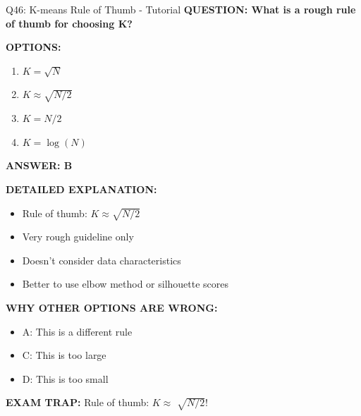 \documentclass[8pt]{beamer}
\begin{document}
	\begin{frame}{Q46: K-means Rule of Thumb - Tutorial}
		\fontsize{6.5}{7.5}\selectfont
		\textbf{QUESTION: What is a rough rule of thumb for choosing K?}
		
		\vspace{0.1cm}
		\textbf{OPTIONS:}
		\begin{enumerate}
			\item $K = \sqrt{N}$
			\item $K \approx \sqrt{N/2}$
			\item $K = N/2$
			\item $K = \log(N)$
		\end{enumerate}
		
		\vspace{0.1cm}
		\textcolor{myblue}{\textbf{ANSWER: B}}
		
		\vspace{0.1cm}
		\textbf{DETAILED EXPLANATION:}
		\begin{itemize}
			\item Rule of thumb: $K \approx \sqrt{N/2}$
			\item Very rough guideline only
			\item Doesn't consider data characteristics
			\item Better to use elbow method or silhouette scores
		\end{itemize}
		
		\vspace{0.1cm}
		\textcolor{myred}{\textbf{WHY OTHER OPTIONS ARE WRONG:}}
		\begin{itemize}
			\item \textcolor{myred}{A:} This is a different rule
			\item \textcolor{myred}{C:} This is too large
			\item \textcolor{myred}{D:} This is too small
		\end{itemize}
		
		\textcolor{myred}{\textbf{EXAM TRAP:}} Rule of thumb: $K \approx$ \textcolor{myblue}{$\sqrt{N/2}$}!
	\end{frame}
	
\end{document}
